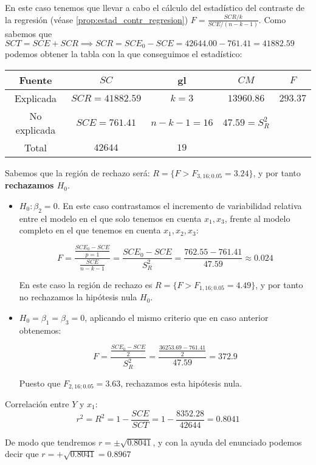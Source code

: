 \begin{problem}[9]
En este caso tenemos que llevar a cabo el cálculo del estadístico del contraste de la regresión (véase \ref{prop:estad_contr_regresion}) $F = \frac{SCR/k}{SCE/(n-k-1)}$. Como sabemos que $SCT = SCE + SCR \implies SCR = SCE_0-SCE = 42644.00 - 761.41 = 41882.59$ podemos obtener la tabla con la que conseguimos el estadístico:

\begin{center}
	\begin{tabular}{ c c c c c }
		Fuente & $SC$ & gl & $CM$ & $F$ \\ \hline
		Explicada & $SCR=41882.59$ & $k=3$ & $13960.86$ & $293.37$ \\
		No explicada & $SCE=761.41$ & $n-k-1=16$ & $47.59=S_R^2$ \\ \hline
		Total & $42644$ & $19$
	\end{tabular}
\end{center}

Sabemos que la región de rechazo será: $R = \{ F > F_{3,16;0.05} = 3.24 \}$, y por tanto \textbf{rechazamos $H_0$}.

\spart
\begin{itemize}
	\item $H_0: β_2=0$. En este caso contrastamos el incremento de variabilidad relativa entre el modelo en el que solo tenemos en cuenta $x_1,x_3$, frente al modelo completo en el que tenemos en cuenta $x_1,x_2,x_3$:

	\[F = \frac{\frac{SCE_0 - SCE}{p=1}}{\frac{SCE}{n-k-1}} = \frac{SCE_0 - SCE}{S_R^2} = \frac{762.55 - 761.41}{47.59} ≈ 0.024\]

	En este caso la región de rechazo es $R = \{ F > F_{1,16;0.05} = 4.49 \}$, y por tanto no rechazamos la hipótesis nula $H_0$.

	\item $H_0= β_1=β_3=0$, aplicando el mismo criterio que en caso anterior obtenemos:

	\[F = \frac{\frac{SCE_0 - SCE}{2}}{S_R^2} = \frac{\frac{36253.69 - 761.41}{2}}{47.59} = 372.9\]

	Puesto que $F_{2,16;0.05}=3.63$, rechazamos esta hipótesis nula.
\end{itemize}

\spart
Correlación entre $Y$ y $x_1$:
\[r^2 = R^2 = 1 - \frac{SCE}{SCT} = 1 - \frac{8352.28}{42644} = 0.8041\]

De modo que tendremos $r=\pm \sqrt{0.8041}$, y con la ayuda del enunciado podemos decir que $r = +\sqrt{0.8041} = 0.8967$

\end{problem}



